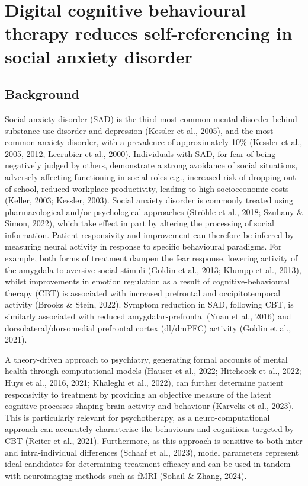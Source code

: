 \documentclass[12pt,a4paper,oneside,]{book} %
\begin{document}
\section{Digital cognitive behavioural therapy reduces self-referencing in social anxiety disorder}\label{digital-cognitive-behavioural-therapy-reduces-self-referencing-in-social-anxiety-disorder}

\subsection{Background}\label{background-1}

Social anxiety disorder (SAD) is the third most common mental disorder behind substance use disorder and depression (Kessler et al., 2005), and the most common anxiety disorder, with a prevalence of approximately 10\% (Kessler et al., 2005, 2012; Lecrubier et al., 2000). Individuals with SAD, for fear of being negatively judged by others, demonstrate a strong avoidance of social situations, adversely affecting functioning in social roles e.g., increased risk of dropping out of school, reduced workplace productivity, leading to high socioeconomic costs (Keller, 2003; Kessler, 2003). Social anxiety disorder is commonly treated using pharmacological and/or psychological approaches (Ströhle et al., 2018; Szuhany \& Simon, 2022), which take effect in part by altering the processing of social information. Patient responsivity and improvement can therefore be inferred by measuring neural activity in response to specific behavioural paradigms. For example, both forms of treatment dampen the fear response, lowering activity of the amygdala to aversive social stimuli (Goldin et al., 2013; Klumpp et al., 2013), whilst improvements in emotion regulation as a result of cognitive-behavioural therapy (CBT) is associated with increased prefrontal and occipitotemporal activity (Brooks \& Stein, 2022). Symptom reduction in SAD, following CBT, is similarly associated with reduced amygdalar-prefrontal (Yuan et al., 2016) and dorsolateral/dorsomedial prefrontal cortex (dl/dmPFC) activity (Goldin et al., 2021).

A theory-driven approach to psychiatry, generating formal accounts of mental health through computational models (Hauser et al., 2022; Hitchcock et al., 2022; Huys et al., 2016, 2021; Khaleghi et al., 2022), can further determine patient responsivity to treatment by providing an objective measure of the latent cognitive processes shaping brain activity and behaviour (Karvelis et al., 2023). This is particularly relevant for psychotherapy, as a neuro-computational approach can accurately characterise the behaviours and cognitions targeted by CBT (Reiter et al., 2021). Furthermore, as this approach is sensitive to both inter and intra-individual differences (Schaaf et al., 2023), model parameters represent ideal candidates for determining treatment efficacy and can be used in tandem with neuroimaging methods such as fMRI (Sohail \& Zhang, 2024).
\end{document}
